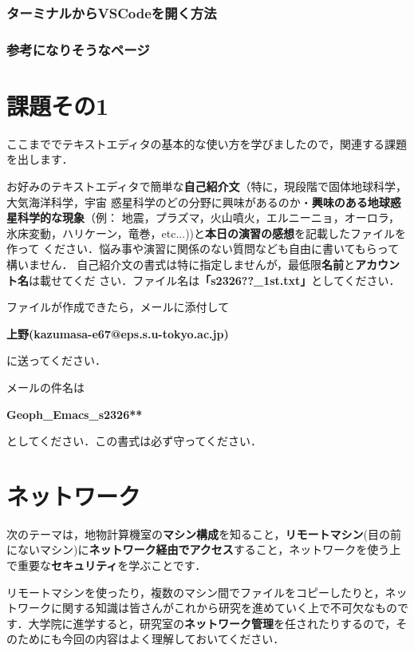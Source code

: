 \documentclass{jarticle}
\begin{document}
\subsubsection{ターミナルからVSCodeを開く方法}

\subsubsection{参考になりそうなページ}


\section{課題その1}
ここまででテキストエディタの基本的な使い方を学びましたので，関連する課題を出します．

お好みのテキストエディタで簡単な{\bf 自己紹介文}（特に，現段階で固体地球科学，大気海洋科学，宇宙
惑星科学のどの分野に興味があるのか・{\bf 興味のある地球惑星科学的な現象}（例：
  地震，プラズマ，火山噴火，エルニーニョ，オーロラ，氷床変動，ハリケーン，竜巻，etc...))と{\bf 本日の演習の感想}を記載したファイルを作って
ください．悩み事や演習に関係のない質問なども自由に書いてもらって構いません．
自己紹介文の書式は特に指定しませんが，最低限{\bf 名前}と{\bf アカウント名}は載せてくだ
さい．ファイル名は{\bf 「s2326??\_1st.txt」}としてください．

ファイルが作成できたら，メールに添付して
\begin{center}
{\bf{上野(kazumasa-e67@eps.s.u-tokyo.ac.jp)}}
\end{center}
に送ってください．

メールの件名は 
\begin{center}
{\bf{Geoph\_Emacs\_s2326**}}\\
\end{center}
としてください．この書式は必ず守ってください．

\section{ネットワーク}
次のテーマは，地物計算機室の{\bf マシン構成}を知ること，{\bf リモートマシン}(目の前にないマシン)に{\bf ネットワーク経由でアクセス}すること，ネットワークを使う上で重要な{\bf セキュリティ}を学ぶことです．

リモートマシンを使ったり，複数のマシン間でファイルをコピーしたりと，ネットワークに関する知識は皆さんがこれから研究を進めていく上で不可欠なものです．大学院に進学すると，研究室の{\bf ネットワーク管理}を任されたりするので，そのためにも今回の内容はよく理解しておいてください．
\end{document}

